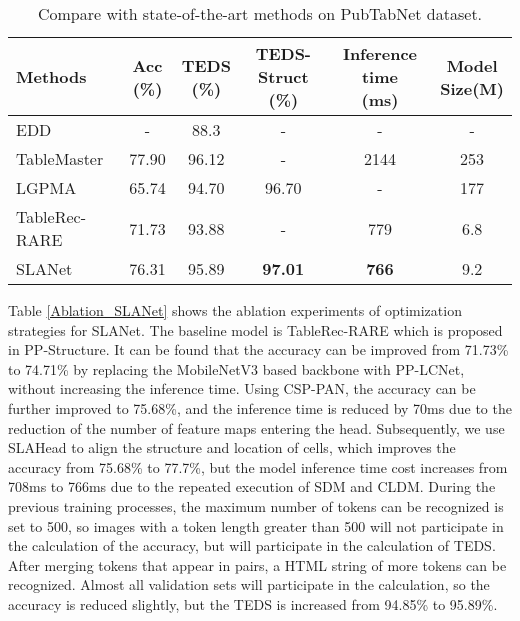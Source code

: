 \documentclass[letterpaper]{article} \usepackage{aaai21}  \usepackage{times}  \usepackage{helvet} \usepackage{courier}  \usepackage[hyphens]{url}  \usepackage{graphicx} \usepackage{algorithm}
\begin{document}
\begin{table*}[h]
\begin{center}
\begin{tabular}{l|c|c|c|c|c}
\hline
Methods & \makecell{Acc \\ (\%)} & \makecell{TEDS \\ (\%)} & \makecell{TEDS-Struct \\ (\%)} & \makecell{Inference time \\ (ms)} &  \makecell{Model \\ Size(M)}\\
\hline

EDD & - &	88.3 &	-&	- &	- \\
TableMaster & 77.90 &	96.12 &	- &	2144 &	253 \\
LGPMA  & 65.74 & 94.70 &	96.70 &	- &	177 \\
TableRec-RARE &	71.73 &	93.88 &	- &	779 &	6.8 \\
\hline
SLANet & 76.31 &	95.89 &	\textbf{97.01} &	\textbf{766} &	9.2 \\

\hline
\end{tabular}
\end{center}
\caption{Compare with state-of-the-art methods on PubTabNet dataset.}
\label{SOTA_SLANet}
\end{table*}


Table \ref{Ablation_SLANet} shows the ablation experiments of optimization strategies for SLANet. The baseline model is TableRec-RARE which is proposed in PP-Structure. It can be found that the accuracy can be improved from 71.73\% to 74.71\% by replacing the MobileNetV3 based backbone with PP-LCNet, without increasing the inference time. Using CSP-PAN, the accuracy can be further improved to 75.68\%, and the inference time is reduced by 70ms due to the reduction of the number of feature maps entering the head. Subsequently, we use SLAHead to align the structure and location of cells, which improves the accuracy from 75.68\% to 77.7\%, but the model inference time cost increases from 708ms to 766ms due to the repeated execution of SDM and CLDM. During the previous training processes, the maximum number of tokens can be recognized is set to 500, so images with a token length greater than 500 will not participate in the calculation of the accuracy, but will participate in the calculation of TEDS. After merging tokens that appear in pairs, a HTML string of more tokens can be recognized. Almost all validation sets will participate in the calculation, so the accuracy is reduced slightly, but the TEDS is increased from 94.85\% to 95.89\%. 
\end{document}
